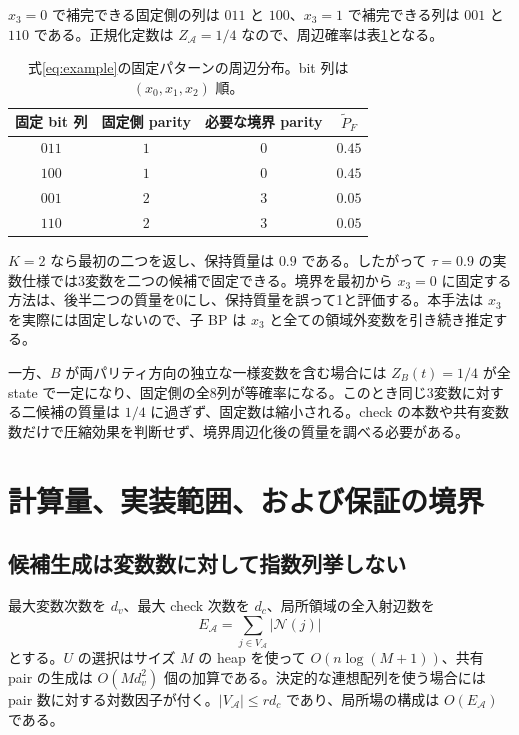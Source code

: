 \documentclass[a4paper,11pt]{ltjsarticle}
\numberwithin{equation}{section}
\theoremstyle{definition}
\newcommand{\N}{\mathcal N}
\newcommand{\A}{\mathcal A}
\begin{document}
$x_3=0$ で補完できる固定側の列は $011$ と $100$、$x_3=1$ で補完できる列は $001$ と $110$ である。正規化定数は $Z_\A=1/4$ なので、周辺確率は表\ref{tab:example}となる。

\begin{table}[H]
\centering
\caption{式\eqref{eq:example}の固定パターンの周辺分布。bit 列は $(x_0,x_1,x_2)$ 順。}
\label{tab:example}
\begin{tabular}{@{}cccc@{}}
\toprule
固定 bit 列 & 固定側 parity & 必要な境界 parity & $\widetilde P_F$ \\
\midrule
$011$ & $1$ & $0$ & $0.45$ \\
$100$ & $1$ & $0$ & $0.45$ \\
$001$ & $2$ & $3$ & $0.05$ \\
$110$ & $2$ & $3$ & $0.05$ \\
\bottomrule
\end{tabular}
\end{table}

$K=2$ なら最初の二つを返し、保持質量は $0.9$ である。したがって $\tau=0.9$ の実数仕様では3変数を二つの候補で固定できる。境界を最初から $x_3=0$ に固定する方法は、後半二つの質量を0にし、保持質量を誤って1と評価する。本手法は $x_3$ を実際には固定しないので、子 BP は $x_3$ と全ての領域外変数を引き続き推定する。

一方、$B$ が両パリティ方向の独立な一様変数を含む場合には $Z_B(t)=1/4$ が全 state で一定になり、固定側の全8列が等確率になる。このとき同じ3変数に対する二候補の質量は $1/4$ に過ぎず、固定数は縮小される。check の本数や共有変数数だけで圧縮効果を判断せず、境界周辺化後の質量を調べる必要がある。

\section{計算量、実装範囲、および保証の境界}
\subsection{候補生成は変数数に対して指数列挙しない}
最大変数次数を $d_v$、最大 check 次数を $d_c$、局所領域の全入射辺数を
\begin{equation}
 E_\A=\sum_{j\in V_\A}|\N(j)|
\end{equation}
とする。$U$ の選択はサイズ $M$ の heap を使って $O(n\log(M+1))$、共有 pair の生成は $O(Md_v^2)$ 個の加算である。決定的な連想配列を使う場合には pair 数に対する対数因子が付く。$|V_\A|\le r d_c$ であり、局所場の構成は $O(E_\A)$ である。
\end{document}
